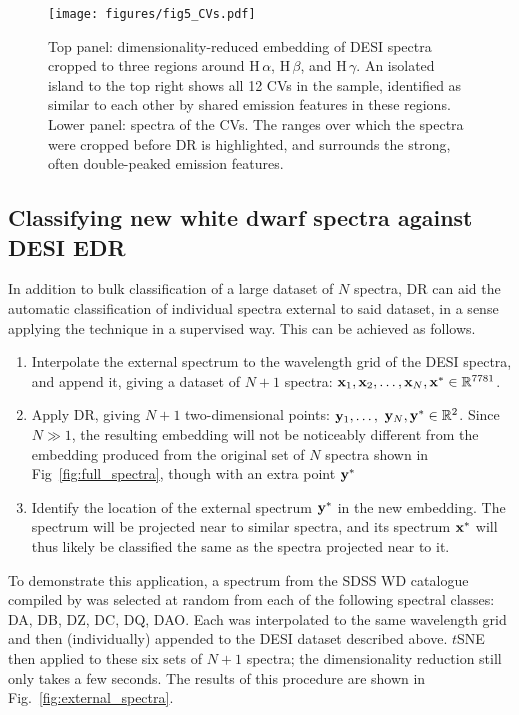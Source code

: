 \documentclass[fleqn,usenatbib]{mnras}
\def\xb{\vb{x}}
\def\yb{\vb{y}}
\begin{document}
\begin{figure}
\centering
\texttt{[image: figures/fig5\_CVs.pdf]}
\caption{
    Top panel: dimensionality-reduced embedding of DESI spectra cropped to three regions around H\,$\alpha$, H\,$\beta$, and H\,$\gamma$.
    An isolated island to the top right shows all 12 CVs in the sample, identified as similar to each other by shared emission features in these regions.
    Lower panel: spectra of the CVs.
    The ranges over which the spectra were cropped before DR is highlighted, and surrounds the strong, often double-peaked emission features.
}
\label{fig:CVs}
\end{figure}


\subsection{Classifying new white dwarf spectra against DESI EDR}

In addition to bulk classification of a large dataset of $N$ spectra, DR can aid the automatic classification of individual spectra external to said dataset, in a sense applying the technique in a supervised way.
This can be achieved as follows.
\begin{enumerate}
\item
Interpolate the external spectrum to the wavelength grid of the DESI spectra, and append it, giving a dataset of $N+1$ spectra: $\xb_1, \xb_2, \dots, \xb_N, \xb^* \in \mathbb{R}^{7781}$.
\item
Apply DR, giving $N+1$ two-dimensional points: $\yb_1, \dots,$ $\yb_N, \yb^* \in \mathbb{R}^2$.
Since $N\gg1$, the resulting embedding will not be noticeably different from the embedding produced from the original set of $N$ spectra shown in Fig~\ref{fig:full_spectra}, though with an extra point $\yb^*$
\item
Identify the location of the external spectrum $\yb^*$ in the new embedding.
The spectrum will be projected near to similar spectra, and its spectrum $\xb^*$ will thus likely be classified the same as the spectra projected near to it.
\end{enumerate}

To demonstrate this application, a spectrum from the SDSS WD catalogue compiled by \citet{gentilefusillo19} was selected at random from each of the following spectral classes: DA, DB, DZ, DC, DQ, DAO.
Each was interpolated to the same wavelength grid and then (individually) appended to the DESI dataset described above.
$t$SNE then applied to these six sets of $N+1$ spectra; the dimensionality reduction still only takes a few seconds.
The results of this procedure are shown in Fig.~\ref{fig:external_spectra}.
\end{document}
